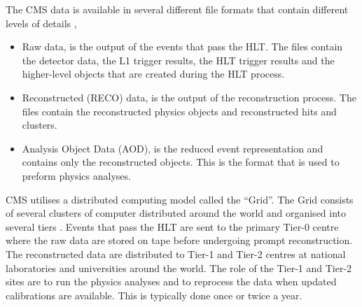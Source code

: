 The {CMS} data is available in several different file formats that contain
different levels of details \cite{grandi2004cms},
\begin{itemize}
\item Raw data, is the output of the events that pass the {HLT}. The files
contain the detector data, the {L1} trigger results, the {HLT} trigger
results and the higher-level objects that are created during the {HLT}
process.
\item Reconstructed (RECO) data, is the output of the reconstruction process.
The files contain the reconstructed physics objects and reconstructed hits and
clusters.
\item Analysis Object Data (AOD), is the reduced event representation and
contains only the reconstructed objects. This is the format that is used to
preform physics analyses.
\end{itemize}

CMS utilises a distributed computing model called the ``Grid''.  The Grid
consists of several clusters of computer distributed around the world and
organised into several tiers \cite{grandi2004cms}.  Events that pass the {HLT}
are sent to the primary Tier-0 centre where the raw data are stored on tape
before undergoing prompt reconstruction. The reconstructed data are distributed
to Tier-1 and Tier-2 centres at national laboratories and universities around the
world. The role of the Tier-1 and Tier-2 sites are to run the physics analyses
and to reprocess the data when updated calibrations are available. This is
typically done once or twice a year.

